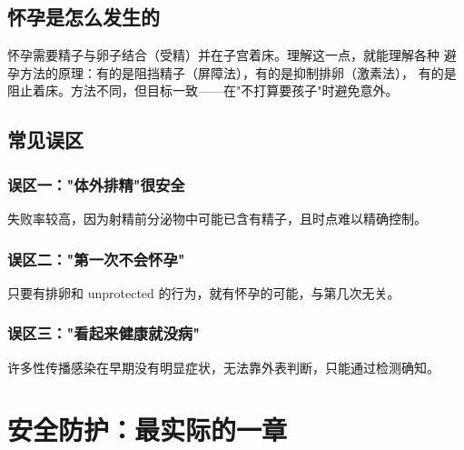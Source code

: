 \documentclass[12pt,UTF8,openany]{ctexbook}
\begin{document}
\section{怀孕是怎么发生的}

怀孕需要精子与卵子结合（受精）并在子宫着床。理解这一点，就能理解各种
避孕方法的原理：有的是阻挡精子（屏障法），有的是抑制排卵（激素法），
有的是阻止着床。方法不同，但目标一致——在"不打算要孩子"时避免意外。

\section{常见误区}

\subsection*{误区一："体外排精"很安全}
失败率较高，因为射精前分泌物中可能已含有精子，且时点难以精确控制。

\subsection*{误区二："第一次不会怀孕"}
只要有排卵和 unprotected 的行为，就有怀孕的可能，与第几次无关。

\subsection*{误区三："看起来健康就没病"}
许多性传播感染在早期没有明显症状，无法靠外表判断，只能通过检测确知。

\chapter{安全防护：最实际的一章}
\end{document}
